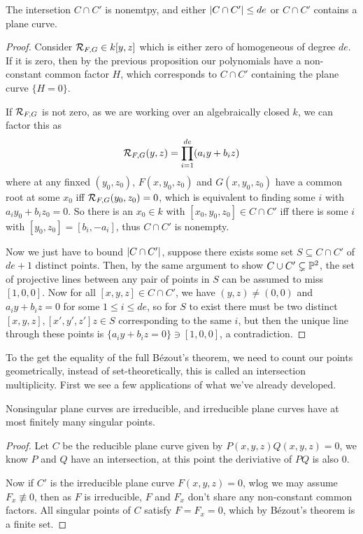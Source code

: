 \documentclass{article}
\begin{document}
\begin{theorem}
    The intersetion $C\cap C'$ is nonemtpy, and either $\left| C\cap C' \right|\leq de$ or $C\cap C'$ contains a plane curve.
    \begin{proof}
        Consider $\mathcal{R}_{F,G}\in k[y,z]$ which is either zero of homogeneous of degree $de$. If it is zero, then by the previous proposition our polynomials have a non-constant common factor $H$, which corresponds to $C\cap C'$ containing the plane curve $\{H=0\}$.

        If $\mathcal{R}_{F,G}$ is not zero, as we are working over an algebraically closed $k$, we can factor this as \[
        \mathcal{R}_{F,G}(y,z) = \prod_{i=1}^{de}(a_iy + b_iz)
        \] where at any finxed $(y_0,z_0)$, $F(x,y_0,z_0)$ and $G(x,y_0,z_0)$ have a common root at some $x_0$ iff $\mathcal{R}_{F,G}(y_0,z_0)=0$, which is equivalent to finding some $i$ with $a_iy_0 + b_iz_0 = 0$. So there is an $x_0\in k$ with  $[x_0,y_0,z_0]\in C\cap C'$ iff there is some $i$ with $[y_0,z_0] = [b_i,-a_i]$, thus $C\cap C'$ is nonempty.

        Now we just have to bound $\left| C\cap C' \right|$, suppose there exists some set $S\subseteq C\cap C'$ of $de+1$ distinct points. Then, by the same argument to show $C\cup C' \subsetneq \mathbb{P}^2$, the set of projective lines between any pair of points in $S$ can be assumed to miss $[1,0,0]$. Now for all $[x,y,z]\in C\cap C'$, we have $(y,z)\neq (0,0)$ and $a_iy + b_iz = 0$ for some $1\leq i \leq de$, so for $S$ to exist there must be two distinct $[x,y,z], [x',y',z']z \in S$ corresponding to the same $i$, but then the unique line through these points is $\{a_iy + b_iz=0\}\ni [1,0,0]$, a contradiction.
    \end{proof}
\end{theorem}

To the get the equality of the full B\'ezout's theorem, we need to count our points geometrically, instead of set-theoretically, this is called an intersection multiplicity. First we see a few applications of what we've already developed.

\begin{proposition}
    Nonsingular plane curves are irreducible, and irreducible plane curves have at most finitely many singular points.
    \begin{proof}
        Let $C$ be the reducible plane curve given by $P(x,y,z)Q(x,y,z)=0$, we know $P$ and $Q$ have an intersection, at this point the deriviative of $PQ$ is also $0$.

        Now if $C'$ is the irreducible plane curve $F(x,y,z)=0$, wlog we may assume $F_x\not\equiv 0$, then as $F$ is irreducible, $F$ and $F_x$ don't share any non-constant common factors. All singular points of $C$ satisfy $F=F_x = 0$, which by B\'ezout's theorem is a finite set.
    \end{proof}
\end{proposition}
\end{document}
